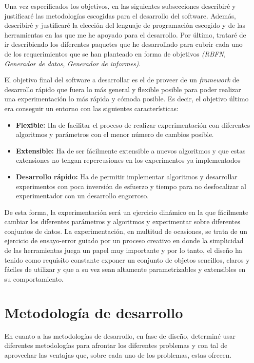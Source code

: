 \documentclass[10pt,a4paper]{report}
\begin{document}
Una vez especificados los objetivos, en las siguientes subsecciones describiré y justificaré las metodologías escogidas para el desarrollo del software. Además, describiré y justificaré la elección del lenguaje de programación escogido y de las herramientas en las que me he apoyado para el desarrollo. Por último, trataré de ir describiendo los diferentes paquetes que he desarrollado para cubrir cada uno de los requerimientos que se han planteado en forma de objetivos \textit{(RBFN, Generador de datos, Generador de informes)}.

El objetivo final del software a desarrollar es el de proveer de un \textit{framework} de desarrollo rápido que fuera lo más general y flexible posible para poder realizar una experimentación lo más rápida y cómoda posible. Es decir, el objetivo último era conseguir un entorno con las siguientes características:
\begin{itemize}
	\item \textbf{Flexible:} Ha de facilitar el proceso de realizar experimentación con diferentes algoritmos y parámetros con el menor número de cambios posible.
	\item \textbf{Extensible:} Ha de ser fácilmente extensible a nuevos algoritmos y que estas extensiones no tengan repercusiones en los experimentos ya implementados
	\item \textbf{Desarrollo rápido:} Ha de permitir implementar algoritmos y desarrollar experimentos con poca inversión de esfuerzo y tiempo para no desfocalizar al experimentador con un desarrollo engorroso.
\end{itemize}

De esta forma, la experimentación será un ejercicio dinámico en la que fácilmente cambiar los diferentes parámetros y algoritmos y experimentar sobre diferentes conjuntos de datos. La experimentación, en multitud de ocasiones, se trata de un ejercicio de ensayo-error guiado por un proceso creativo en donde la simplicidad de las herramientas juega un papel muy importante y por lo tanto, el diseño ha tenido como requisito constante exponer un conjunto de objetos sencillos, claros y fáciles de utilizar y que a su vez sean altamente parametrizables y extensibles en su comportamiento.


\section{Metodología de desarrollo}
En cuanto a las metodologías de desarrollo, en fase de diseño, determiné usar diferentes metodologías para afrontar los diferentes problemas y con tal de aprovechar las ventajas que, sobre cada uno de los problemas, estas ofrecen.
\end{document}
